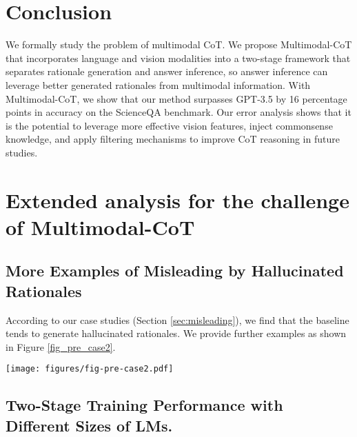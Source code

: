 \documentclass[nohyperref]{article}
\theoremstyle{plain}
\theoremstyle{definition}
\theoremstyle{remark}
\begin{document}
\section{Conclusion}
We formally study the problem of multimodal CoT. {We propose Multimodal-CoT that incorporates language and vision modalities into a two-stage framework that separates rationale generation and answer inference, so answer inference can leverage better generated rationales from multimodal information.} With Multimodal-CoT, we show that {our method surpasses GPT-3.5 by 16 percentage points in accuracy on the ScienceQA benchmark.} Our error analysis shows that it is the potential to leverage more effective vision features, inject commonsense knowledge, and apply filtering mechanisms to improve CoT reasoning in future studies.





\newpage
\appendix
\onecolumn
\section{Extended analysis for the challenge of Multimodal-CoT}

\subsection{More Examples of Misleading by Hallucinated Rationales}\label{appendix:misleading}

According to our case studies (Section \ref{sec:misleading}), we find that the baseline tends to generate hallucinated rationales. We provide further examples as shown in Figure \ref{fig_pre_case2}.

\begin{figure*}[!htb]
  \begin{center}
   \texttt{[image: figures/fig-pre-case2.pdf]}
  \end{center}
  \vspace{-3mm}
  \caption{Examples of the two-stage framework without vision features (baseline) and with vision features (ours) for generating rationales and predicting answers. The upper part presents the problem details, and the lower part shows the outputs of the baseline and our method. 
  }
    \vspace{-3mm}
  \label{fig_pre_case2}
\end{figure*}



\subsection{Two-Stage Training Performance with Different Sizes of LMs.}\label{appendix:lms}
\end{document}
